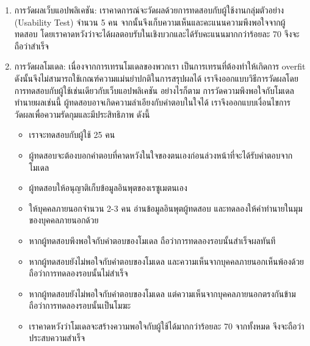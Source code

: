 \begin{enumerate}
    \item การวัดผลเว็บแอปพลิเคชัน: เราคาดการณ์จะวัดผลด้วยการทดสอบกับผู้ใช้งานกลุ่มตัวอย่าง (Usability Test) จำนวน 5 คน จากนั้นจึงเก็บความเห็นและคะแนนความพึงพอใจจากผู้ทดสอบ
          โดยเราคาดหวังว่าจะได้ผลตอบรับในเชิงบวกและได้รับคะแนนมากกว่าร้อยละ 70 จึงจะถือว่าสำเร็จ
    \item การวัดผลโมเดล: เนื่องจากการเทรนโมเดลของพวกเรา เป็นการเทรนที่ต้องทำให้เกิดการ overfit ดังนั้นจึงไม่สามารถใช้เกณฑ์ความแม่นยำปกติในการสรุปผลได้
          เราจึงออกแบบวิธีการวัดผลโดยการทดสอบกับผู้ใช้เช่นเดียวกับเว็บแอปพลิเคชัน อย่างไรก็ตาม การวัดความพึงพอใจกับโมเดลทำนายผลเช่นนี้
          ผู้ทดสอบอาจเกิดความลำเอียงกับคำตอบในใจได้ เราจึงออกแบบเงื่อนไขการวัดผลเพื่อความรัดกุมและมีประสิทธิภาพ ดังนี้
          \begin{itemize}
              \item เราจะทดสอบกับผู้ใช้ 25 คน
              \item ผู้ทดสอบจะต้องบอกคำตอบที่คาดหวังในใจของตนเองก่อนล่วงหน้าที่จะได้รับคำตอบจากโมเดล
              \item ผู้ทดสอบให้อนุญาติเก็บข้อมูลอินพุตของเรซูเมตนเอง
              \item ให้บุคคลภายนอกจำนวน 2-3 คน อ่านข้อมูลอินพุตผู้ทดสอบ และทดลองให้คำทำนายในมุมของบุคคลภายนอกด้วย
              \item หากผู้ทดสอบพึงพอใจกับคำตอบของโมเดล ถือว่าการทดลองรอบนั้นสำเร็จผลทันที
              \item หากผู้ทดสอบยังไม่พอใจกับคำตอบของโมเดล และความเห็นจากบุคคลภายนอกเห็นพ้องด้วย ถือว่าการทดลองรอบนั้นไม่สำเร็จ
              \item หากผู้ทดสอบยังไม่พอใจกับคำตอบของโมเดล แต่ความเห็นจากบุคคลภายนอกตรงกันข้าม ถือว่าการทดลองรอบนั้นเป็นโมฆะ
              \item เราคาดหวังว่าโมเดลจะสร้างความพอใจกับผู้ใช้ได้มากกว่าร้อยละ 70 จากทั้งหมด จึงจะถือว่าประสบความสำเร็จ
          \end{itemize}
\end{enumerate}





